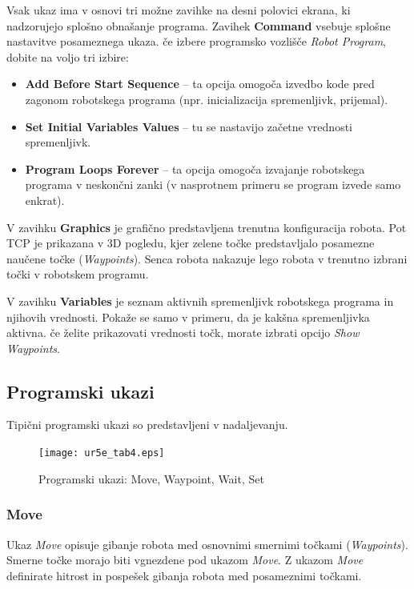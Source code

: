 Vsak ukaz ima v osnovi tri možne zavihke na desni polovici ekrana, ki nadzorujejo splošno obnašanje programa. Zavihek \textbf{Command} vsebuje splošne nastavitve posameznega ukaza. če izbere programsko vozlišče \emph{Robot Program}, dobite na voljo tri izbire:
\begin{itemize}
  \item \textbf{Add Before Start Sequence} -- ta opcija omogoča izvedbo kode pred zagonom robotskega programa (npr. inicializacija spremenljivk, prijemal).
  \item \textbf{Set Initial Variables Values} -- tu se nastavijo začetne vrednosti spremenljivk.
  \item \textbf{Program Loops Forever} -- ta opcija omogoča izvajanje robotskega programa v neskončni zanki (v nasprotnem primeru se program izvede samo enkrat).
\end{itemize}

V zavihku \textbf{Graphics} je grafično predstavljena trenutna konfiguracija robota. Pot TCP je prikazana v 3D pogledu, kjer zelene točke predstavljalo posamezne naučene točke (\emph{Waypoints}). Senca robota nakazuje lego robota v trenutno izbrani točki v robotskem programu.

V zavihku \textbf{Variables}  je seznam aktivnih spremenljivk robotskega programa in njihovih vrednosti. Pokaže se samo v primeru, da je kakšna spremenljivka aktivna. če želite prikazovati vrednosti točk, morate izbrati opcijo \emph{Show Waypoints}.


\subsection{Programski ukazi}

Tipični programski ukazi so predstavljeni v nadaljevanju.

\begin{figure}[!hbt]
\centering
\texttt{[image: ur5e\_tab4.eps]}
\caption{Programski ukazi: Move, Waypoint, Wait,  Set}
\label{fig:ur_tab3}
\end{figure}



\subsubsection{Move}

Ukaz \emph{Move} opisuje gibanje robota med osnovnimi smernimi točkami (\emph{Waypoints}). Smerne točke morajo biti vgnezdene pod ukazom \emph{Move}. Z ukazom \emph{Move} definirate hitrost in pospešek gibanja robota med posameznimi točkami.

